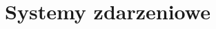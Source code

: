 \documentclass[12pt, a4paper]{article}
\title{Systemy zdarzeniowe}
\begin{document}
\def\tablename{Tabela}
\begin{titlingpage}
\maketitle
\end{titlingpage}
\newpage
\tableofcontents %
\newpage
\newpage
\newpage
 \newpage
 \newpage
 
\end{document}

